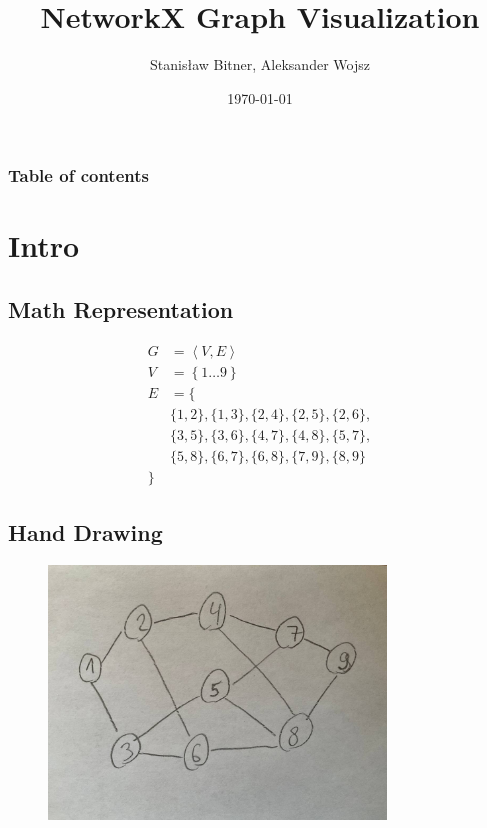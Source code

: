 \documentclass[11pt]{beamer}
\title{NetworkX Graph Visualization}
\author{Stanisław Bitner, Aleksander Wojsz}
\date{\today}
\begin{document}
\frame{\titlepage}

\begin{frame}
    \frametitle{Table of contents}
    \tableofcontents[hideallsubsections]
\end{frame}

\section{Intro}

\subsection{Math Representation}
\begin{frame}{\subsecname}
    \begin{align*}
        G &= \left\langle V, E \right\rangle\\
        V &= \left\{ 1 \hdots 9 \right\}\\
        E &= \{\\
            &\{ 1, 2 \}, \{ 1, 3 \}, \{ 2, 4 \}, \{ 2, 5 \}, \{ 2, 6 \},\\
            &\{ 3, 5 \}, \{ 3, 6 \}, \{ 4, 7 \}, \{ 4, 8 \}, \{ 5, 7 \},\\
            &\{ 5, 8 \}, \{ 6, 7 \}, \{ 6, 8 \}, \{ 7, 9 \}, \{ 8, 9 \}\\
        \}
    \end{align*}
\end{frame}

\subsection{Hand Drawing}
\begin{frame}{\subsecname}
    \begin{figure}
        \centering
        \includegraphics[width=0.8\textwidth]{figures/hand1.jpg}
    \end{figure}
\end{frame}
\end{document}
